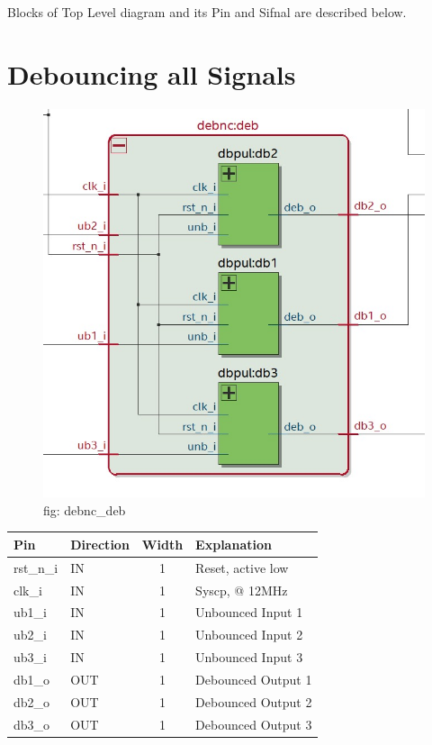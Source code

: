 \documentclass[12pt,a4 paper] {report}
\begin{document}
\newpage

Blocks of Top Level diagram and its Pin and Sifnal are described below. 

\section{Debouncing all Signals}	
\begin{figure}[h]
	\centering	
	\includegraphics[scale=0.3]{../png/debnc_deb.png}
	\newline
	fig: debnc\_deb \\
\end{figure}

\begin{center}
	\begin{tabular}{ | p{2cm} | p{2cm} | c| p{4cm} |}
	\hline
	Pin & Direction & Width & Explanation\\
	\hline
	  rst\_n\_i & IN & 1 & Reset, active low\\
	  \hline
	clk\_i   & IN  & 1 & Syscp, @ 12MHz \\
	\hline
	ub1\_i   & IN  &  1 &Unbounced Input 1 \\
	\hline
	ub2\_i   & IN  & 1 &  Unbounced Input 2 \\
	\hline
	ub3\_i   & IN  &  1 & Unbounced Input 3 \\
	\hline
	db1\_o   & OUT &  1 & Debounced Output 1\\
	\hline
	db2\_o   & OUT &  1 & Debounced Output 2\\
	\hline
	db3\_o   & OUT &  1 & Debounced Output 3\\
	\hline
	\end{tabular}
\end{center}
\newpage
\end{document}
